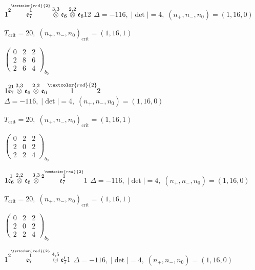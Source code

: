 \documentclass[10pt]{article}
\begin{document}
$1\overset{2\overset{\textcolor{red}{2}}{1}}{\mathfrak{e}_7}\overset{3,3}{\otimes}\mathfrak{e}_6\overset{2,2}{\otimes}\mathfrak{e}_612$ \quad $\Delta=-116,\; |\det|=4,\; (n_+,n_-,n_0)=(1,16,0)$

\hspace{1em}$T_{\text{crit}}=20,\; (n_+,n_-,n_0)_{\text{crit}}=(1,16,1)$

\hspace{2em}$\left(\begin{smallmatrix}0 & 2 & 2 \\ 2 & 8 & 6 \\ 2 & 6 & 4\end{smallmatrix}\right)_{\!b_0}$

$1\overset{21}{\mathfrak{e}_7}\overset{3,3}{\otimes}\mathfrak{e}_6\overset{2,2}{\otimes}\mathfrak{e}_6\overset{\textcolor{red}{2}}{1}2$ \quad $\Delta=-116,\; |\det|=4,\; (n_+,n_-,n_0)=(1,16,0)$

\hspace{1em}$T_{\text{crit}}=20,\; (n_+,n_-,n_0)_{\text{crit}}=(1,16,1)$

\hspace{2em}$\left(\begin{smallmatrix}0 & 2 & 2 \\ 2 & 0 & 2 \\ 2 & 2 & 4\end{smallmatrix}\right)_{\!b_0}$

\smallskip

$1\overset{1}{\mathfrak{e}_6}\overset{2,2}{\otimes}\mathfrak{e}_6\overset{3,3}{\otimes}\overset{2\overset{\textcolor{red}{2}}{1}}{\mathfrak{e}_7}1$ \quad $\Delta=-116,\; |\det|=4,\; (n_+,n_-,n_0)=(1,16,0)$

\hspace{1em}$T_{\text{crit}}=20,\; (n_+,n_-,n_0)_{\text{crit}}=(1,16,1)$

\hspace{2em}$\left(\begin{smallmatrix}0 & 2 & 2 \\ 2 & 0 & 2 \\ 2 & 2 & 4\end{smallmatrix}\right)_{\!b_0}$

\smallskip

$1\overset{2\overset{\textcolor{red}{2}}{1}}{\mathfrak{e}_7}\overset{4,5}{\otimes}\mathfrak{e}_7'1$ \quad $\Delta=-116,\; |\det|=4,\; (n_+,n_-,n_0)=(1,16,0)$
\end{document}
